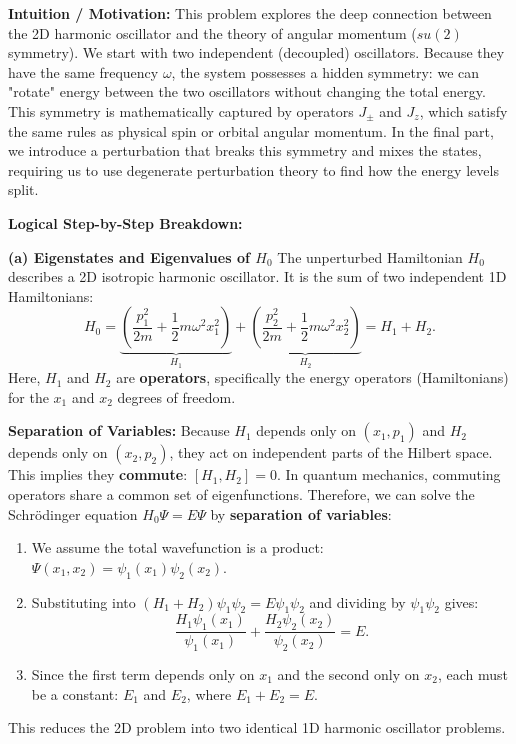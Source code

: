 \begin{solution}
\textbf{Intuition / Motivation:}
This problem explores the deep connection between the 2D harmonic oscillator and the theory of angular momentum ($su(2)$ symmetry). We start with two independent (decoupled) oscillators. Because they have the same frequency $\omega$, the system possesses a hidden symmetry: we can "rotate" energy between the two oscillators without changing the total energy. This symmetry is mathematically captured by operators $J_\pm$ and $J_z$, which satisfy the same rules as physical spin or orbital angular momentum. In the final part, we introduce a perturbation that breaks this symmetry and mixes the states, requiring us to use degenerate perturbation theory to find how the energy levels split.

\textbf{Logical Step-by-Step Breakdown:}

\textbf{(a) Eigenstates and Eigenvalues of $H_0$}
The unperturbed Hamiltonian $H_0$ describes a 2D isotropic harmonic oscillator. It is the sum of two independent 1D Hamiltonians:
\[ H_0 = \underbrace{\left( \frac{p_1^2}{2m} + \frac{1}{2}m\omega^2 x_1^2 \right)}_{H_1} + \underbrace{\left( \frac{p_2^2}{2m} + \frac{1}{2}m\omega^2 x_2^2 \right)}_{H_2} = H_1 + H_2. \]
Here, $H_1$ and $H_2$ are \textbf{operators}, specifically the energy operators (Hamiltonians) for the $x_1$ and $x_2$ degrees of freedom. 

\textbf{Separation of Variables:}
Because $H_1$ depends only on $(x_1, p_1)$ and $H_2$ depends only on $(x_2, p_2)$, they act on independent parts of the Hilbert space. This implies they \textbf{commute}: $[H_1, H_2] = 0$. In quantum mechanics, commuting operators share a common set of eigenfunctions. Therefore, we can solve the Schrödinger equation $H_0 \Psi = E \Psi$ by \textbf{separation of variables}:
\begin{enumerate}
    \item We assume the total wavefunction is a product: $\Psi(x_1, x_2) = \psi_1(x_1) \psi_2(x_2)$.
    \item Substituting into $(H_1 + H_2) \psi_1 \psi_2 = E \psi_1 \psi_2$ and dividing by $\psi_1 \psi_2$ gives:
    \[ \frac{H_1 \psi_1(x_1)}{\psi_1(x_1)} + \frac{H_2 \psi_2(x_2)}{\psi_2(x_2)} = E. \]
    \item Since the first term depends only on $x_1$ and the second only on $x_2$, each must be a constant: $E_1$ and $E_2$, where $E_1 + E_2 = E$.
\end{enumerate}
This reduces the 2D problem into two identical 1D harmonic oscillator problems.


\end{solution}
